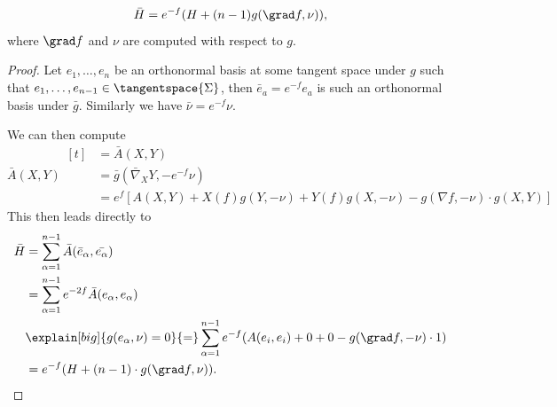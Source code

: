 \documentclass[titlepage,numbers=noenddot,oneside,%
cleardoublepage=empty,paper=a4,fontsize=11pt,%
english,%
]{scrartcl}
\begin{document}
\begin{lemma}\label{lem:mean_curvature_under_conformal_transform}
    \begin{equation*}
        \bar{H}=e^{-f}(H+(n-1) g(\grad f,\nu)),
    \end{equation*}
    where \( \grad f \) and \( \nu \) are computed with respect to \( g \).
\end{lemma}
\begin{proof}
    Let \( e_1,\dotsc,e_n \) be an orthonormal basis at some tangent space under \( g \) such that \( e_1,\dotsc,e_{n-1}\in \tangentspace{\Sigma} \), then \( \bar{e}_a=e^{-f}e_a \) is such an orthonormal basis under \( \bar{g} \). Similarly we have \( \bar{\nu}=e^{-f}\nu \). 

    We can then compute     
    \begin{equation*}
        \bar{A}(X,Y)\begin{aligned}[t]
            &=\bar{A}(X,Y)\\
            &=\bar{g}(\bar{\nabla}_X Y,-e^{-f}\nu)\\
            &=e^{f}[A(X,Y)+X(f) g(Y,-\nu)+Y(f) g(X,-\nu)-g(\nabla f,-\nu)\cdot g(X,Y)]
        \end{aligned}
    \end{equation*}
    This then leads directly to
    \begin{equation*}
        \bar{H}\begin{aligned}[t]
            &=\sum_{\alpha=1}^{n-1}\bar{A}(\bar{e}_\alpha,\bar{e_\alpha})\\
            &=\sum_{\alpha=1}^{n-1}e^{-2f}\bar{A}(e_\alpha,e_\alpha)\\
            &\explain[big]{g(e_{\alpha},\nu)=0}{=}\sum_{\alpha=1}^{n-1}e^{-f}(A(e_i,e_i)+0+0-g(\grad f,-\nu)\cdot 1)\\
            &=e^{-f}(H+(n-1)\cdot g(\grad f,\nu)).
        \end{aligned}
    \end{equation*}
\end{proof}
\end{document}
